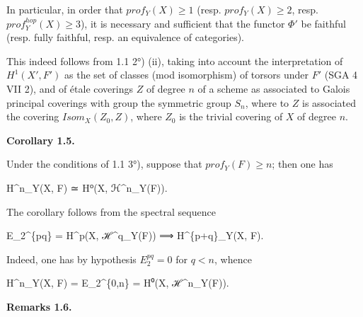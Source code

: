 \documentclass[
  11pt,
  a4paper,
]{book}
\newenvironment{Shaded}{}{}
\newcommand{\NormalTok}[1]{#1}
\begin{document}
In particular, in order that \(prof_{Y}(X) \geqslant 1\) (resp.
\(prof_{Y}(X) \geqslant 2\), resp. \(prof^{hop}_{Y}(X)
\geqslant 3\)), it is necessary and sufficient that the functor
\(\Phi'\) be faithful (resp. fully faithful, resp. an equivalence of
categories).

This indeed follows from 1.1 2°) (ii), taking into account the
interpretation of \(H^{1}(X', F')\) as the set of classes (mod
isomorphism) of torsors under \(F'\) (SGA 4 VII 2), and of étale
coverings \(Z\) of degree \(n\) of a scheme as associated to Galois
principal coverings with group the symmetric group \(S_{n}\), where to
\(Z\) is associated the covering \(Isom_{X}(Z_{0}, Z)\), where \(Z_{0}\)
is the trivial covering of \(X\) of degree \(n\).

\textbf{Corollary 1.5.}

Under the conditions of 1.1 3°), suppose that
\(prof_{Y}(F) \geqslant n\); then one has

\begin{Shaded}
\begin{Highlighting}[]
\NormalTok{H\^{}n\_Y(X, F) ≃ H⁰(X, ℋ\^{}n\_Y(F)).}
\end{Highlighting}
\end{Shaded}

The corollary follows from the spectral sequence

\begin{Shaded}
\begin{Highlighting}[]
\NormalTok{E\_2\^{}\{pq\} = H\^{}p(X, ℋ\^{}q\_Y(F)) ⟹ H\^{}\{p+q\}\_Y(X, F).}
\end{Highlighting}
\end{Shaded}

Indeed, one has by hypothesis \(E^{pq}_{2} = 0\) for \(q < n\), whence

\begin{Shaded}
\begin{Highlighting}[]
\NormalTok{H\^{}n\_Y(X, F) = E\_2\^{}\{0,n\} = H⁰(X, ℋ\^{}n\_Y(F)).}
\end{Highlighting}
\end{Shaded}

\textbf{Remarks 1.6.}
\end{document}
